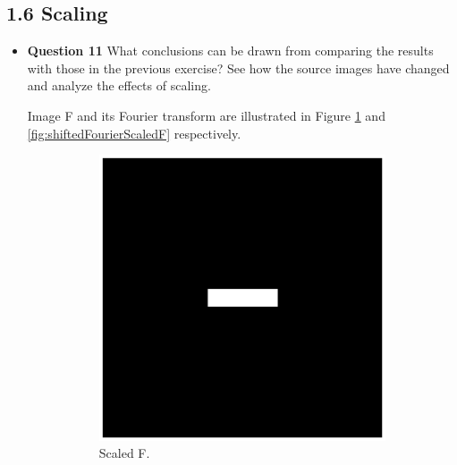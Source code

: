 \documentclass[11pt,a4paper]{article}
\begin{document}
\subsection*{1.6 Scaling}
\begin{itemize}
	\item \textbf{Question 11} What conclusions can be drawn from comparing the results with those in the previous exercise? See how the source images have changed and analyze the effects of scaling.
	\par Image F and its Fourier transform are illustrated in Figure \ref{fig:scaledF} and \ref{fig:shiftedFourierScaledF} respectively.
	\begin{figure}[!ht]
		\scriptsize
		\centering 
		\begin{subfigure}[t]{.49\linewidth} %
		\includegraphics[width=\columnwidth]{Scaling_F.eps}
		\caption{\scriptsize Scaled F.}
		\label{fig:scaledF}
		\end{subfigure}
		\begin{subfigure}[t]{.49\linewidth} %

\end{subfigure}
\end{figure}
\end{itemize}
\end{document}
